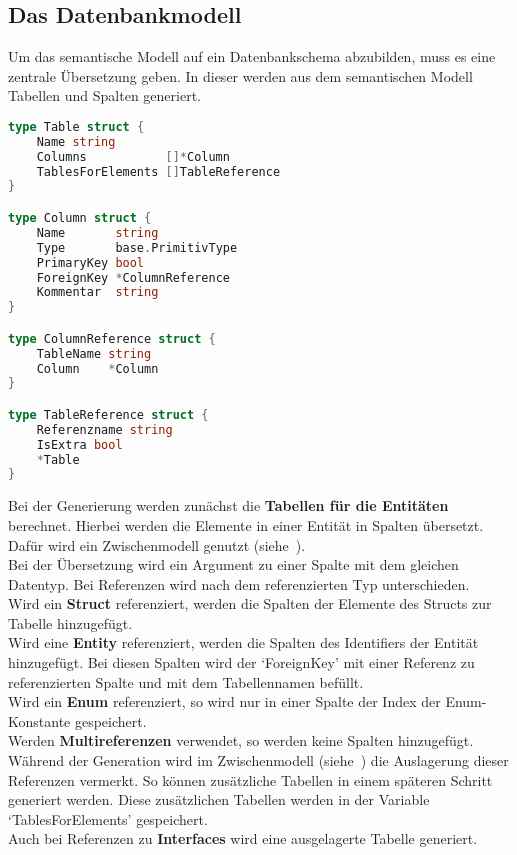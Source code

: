 \documentclass[./einleitung.tex]{subfiles}
\begin{document}
    \subsection{Das Datenbankmodell}\label{subsec:das-datenbankmodell}
    Um das semantische Modell auf ein Datenbankschema abzubilden, muss es eine zentrale Übersetzung geben.
    In dieser werden aus dem semantischen Modell Tabellen und Spalten generiert.
    \begin{lstlisting}[language=Go, caption=Datenstruktur für Tabellen und Spalten, label=lst:tableColumn]
type Table struct {
	Name string
	Columns           []*Column
	TablesForElements []TableReference
}

type Column struct {
	Name       string
	Type       base.PrimitivType
	PrimaryKey bool
	ForeignKey *ColumnReference
	Kommentar  string
}

type ColumnReference struct {
	TableName string
	Column    *Column
}

type TableReference struct {
	Referenzname string
	IsExtra bool
	*Table
}
    \end{lstlisting}
    Bei der Generierung werden zunächst die \textbf{Tabellen für die Entitäten} berechnet.
    Hierbei werden die Elemente in einer Entität in Spalten übersetzt.
    Dafür wird ein Zwischenmodell genutzt (siehe~).\\
    Bei der Übersetzung wird ein Argument zu einer Spalte mit dem gleichen Datentyp.
    Bei Referenzen wird nach dem referenzierten Typ unterschieden.\\
    Wird ein \textbf{Struct} referenziert, werden die Spalten der Elemente des Structs zur Tabelle hinzugefügt.\\
    Wird eine \textbf{Entity} referenziert, werden die Spalten des Identifiers der Entität hinzugefügt.
    Bei diesen Spalten wird der `ForeignKey' mit einer Referenz zu referenzierten Spalte und mit dem Tabellennamen befüllt.\\
    Wird ein \textbf{Enum} referenziert, so wird nur in einer Spalte der Index der Enum-Konstante gespeichert.\\
    Werden \textbf{Multireferenzen} verwendet, so werden keine Spalten hinzugefügt.
    Während der Generation wird im Zwischenmodell (siehe~) die Auslagerung dieser Referenzen vermerkt.
    So können zusätzliche Tabellen in einem späteren Schritt generiert werden.
    Diese zusätzlichen Tabellen werden in der Variable `TablesForElements' gespeichert.\\
    Auch bei Referenzen zu \textbf{Interfaces} wird eine ausgelagerte Tabelle generiert.
\end{document}
